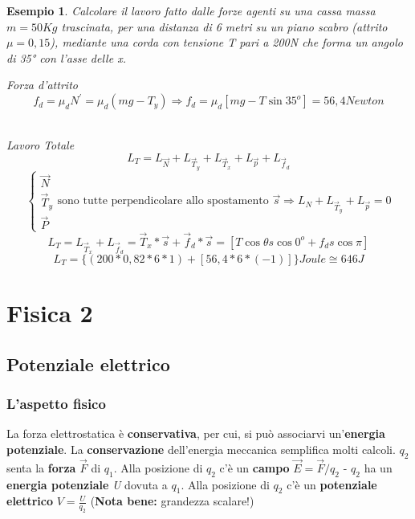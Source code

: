 \documentclass{book}
\newtheorem{esempio}{Esempio}
\begin{document}
\begin{esempio}
	Calcolare il lavoro fatto dalle forze agenti su una cassa massa $m=50Kg$
	trascinata, per una distanza di 6 metri su un piano scabro (attrito
	$\mu=0,15$), mediante una corda con tensione T pari a 200N che forma un
	angolo di 35° con l'asse delle x.\\
	\fbox
	{
	\begin{minipage}{0.75\textwidth}
		Forza d'attrito
		\begin{equation*}
			f_d=\mu_d N^\prime=\mu_d(mg-T_y) \Rightarrow f_d=\mu_d[mg-T\sin
			35^o]=56,4 Newton
		\end{equation*}
	\end{minipage}
	}\\
	Lavoro Totale
	\begin{equation*}
		L_T=L_{\vec{N}}+L_{\vec{T}_y} + L_{\vec{T}_x}+L_{\vec{p}} +
		L_{\vec{f}_d}
	\end{equation*}
	\begin{equation*}
		\begin{cases}
			\vec{N}\\
			\vec{T}_y\\
			\vec{P}
		\end{cases}
		\text{sono tutte perpendicolare allo spostamento } \vec{s} \Rightarrow
		L_N + L_{\vec{T}_y} + L_{\vec{p}} = 0
	\end{equation*}
	\begin{equation*}
		L_T=L_{\vec{T}_x} + L_{\vec{f}_d}=\vec{T}_x*\vec{s} + \vec{f}_d
		*\vec{s} =[T\cos \theta s \cos 0^o +f_ds\cos \pi]
	\end{equation*}
	\begin{equation*}
		L_T=\{(200*0,82*6*1)+[56,4*6*(-1)]\} Joule \cong \boxed{646J}
	\end{equation*}
\end{esempio}



\part {Fisica 2}




\chapter{Potenziale elettrico}
\section{L'aspetto fisico}
La forza elettrostatica è \textbf{conservativa}, per cui, si può associarvi un'\textbf{energia potenziale}. La \textbf{conservazione} dell'energia meccanica semplifica molti calcoli. $q_2$ senta la \textbf{forza} $\vec{F}$ di $q_1$. Alla posizione di $q_2$ c'è un \textbf{campo} $\vec{E}=\vec{F}/q_2$ - $q_2$ ha un \textbf{energia potenziale} \textit{U} dovuta a $q_1$. Alla posizione di $q_2$ c'è un \textbf{potenziale elettrico} $V=\frac{U}{q_2}$ (\textbf{Nota bene:} grandezza scalare!)
\end{document}
